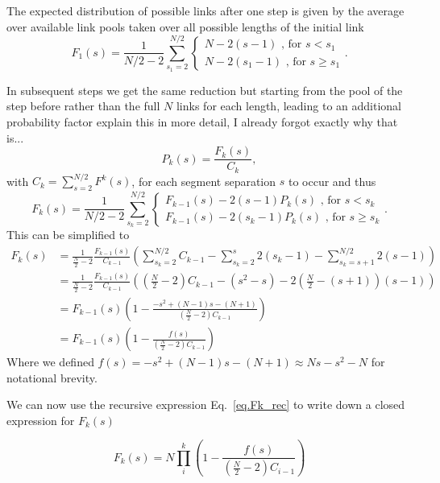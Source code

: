 \documentclass[reprint,amsmath,amssymb,rmp,onecolumn,notitlepage,11pt]{revtex4-1}
\newcommand{\red}[1]{\textcolor{red!80!black}{#1}}
\begin{document}
The expected distribution of possible links after one step is given by the average over available link pools taken over all possible lengths of the initial link
\begin{equation}
    F_1(s)= \frac{1}{N/2-2} \sum_{s_1=2}^{N/2} { \begin{cases}
    N-2(s-1) \text{ , for } s<s_1\\
    N-2(s_1 -1)\text{ , for } s\geq s_1
    \end{cases}}.
\end{equation}

In subsequent steps we get the same reduction but starting from the pool of the step before rather than the full $N$ links for each length, leading to an additional probability factor \red{explain this in more detail, I already forgot exactly why that is...}
\begin{equation}
    P_k(s)=\frac{F_k(s)}{C_k},
    \label{eq.Pk}
\end{equation}
with $C_k=\sum_{s=2}^{N/2}F^k(s)$, for each segment separation $s$ to occur and thus
\begin{equation}
    F_k(s)= \frac{1}{N/2-2} \sum_{s_k=2}^{N/2} {\begin{cases}
     F_{k-1}(s)-2(s-1) P_k(s) \text{ , for } s<s_k\\
     F_{k-1}(s)-2(s_k -1)P_k(s)\text{ , for } s\geq s_k
    \end{cases}}.
\end{equation}
This can be simplified to
\begin{align}
   F_k(s)&= \frac{1}{\frac{N}{2}-2} \frac{F_{k-1}(s)}{C_{k-1}}\left( \sum_{s_k=2}^{N/2}C_{k-1} - \sum_{s_k=2}^{s} 2(s_k-1) - \sum_{s_k=s+1}^{N/2} 2(s -1) \right) \nonumber \\
   &= \frac{1}{\frac{N}{2}-2}\frac{F_{k-1}(s)}{C_{k-1}}\left(\left(\frac{N}{2}-2\right)C_{k-1} -(s^2-s)-2\left(\frac{N}{2}-(s+1)\right)(s-1)\right)  \nonumber \\
   &= F_{k-1}(s)\left(1-\frac{-s^2 +(N-1)s-(N+1)}{(\frac{N}{2}-2)C_{k-1}} \right)\nonumber \\
   &=F_{k-1}(s)\left(1-\frac{f(s)}{(\frac{N}{2}-2)C_{k-1}} \right)
   \label{eq.Fk_rec}
\end{align}
Where we defined $f(s)=-s^2 +(N-1)s-(N+1) \approx N s - s^2 - N$ for notational brevity.

We can now use the recursive expression Eq.~\ref{eq.Fk_rec} to write down a closed expression for $F_k(s)$

\begin{equation}
    F_k(s)=N\prod_{i}^k\left(1-\frac{f(s)}{(\frac{N}{2}-2)C_{i-1}} \right)
\end{equation}
\end{document}
